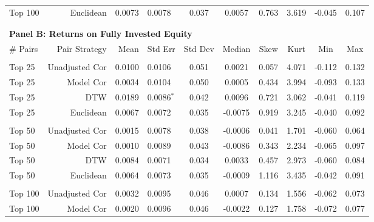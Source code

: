 \begin{table}[hp]
\begin{threeparttable}
\begin{tabular}{l r r l c c c c c c}
            Top 100   & Euclidean      &  0.0073 & 0.0078          & 0.037 &  0.0057 &  0.763 & 3.619 & -0.045 & 0.107 \\
            \vspace{-1mm} \\
            \hline
            \vspace{1 mm} \\
            \multicolumn{9}{l}{\textbf{Panel B: Returns on Fully Invested Equity}} \\
            \# Pairs  & Pair Strategy & Mean & Std Err & Std Dev & Median & Skew & Kurt & Min & Max \\
            \hline
            \vspace{-1mm} \\
            Top 25    & Unadjusted Cor &  0.0100 & 0.0106          & 0.051 &  0.0021 &  0.057 & 4.071 & -0.112 & 0.132 \\
            Top 25    & Model Cor      &  0.0034 & 0.0104          & 0.050 &  0.0005 &  0.434 & 3.994 & -0.093 & 0.133 \\
            Top 25    & DTW            &  0.0189 & 0.0086{$^{*}$}  & 0.042 &  0.0096 &  0.721 & 3.062 & -0.041 & 0.119 \\
            Top 25    & Euclidean      &  0.0067 & 0.0072          & 0.035 & -0.0075 &  0.919 & 3.245 & -0.040 & 0.092 \\
            \vspace{-1mm} \\
            Top 50    & Unadjusted Cor &  0.0015 & 0.0078          & 0.038 & -0.0006 &  0.041 & 1.701 & -0.060 & 0.064 \\
            Top 50    & Model Cor      &  0.0010 & 0.0089          & 0.043 & -0.0086 &  0.343 & 2.234 & -0.065 & 0.097 \\
            Top 50    & DTW            &  0.0084 & 0.0071          & 0.034 &  0.0033 &  0.457 & 2.973 & -0.060 & 0.084 \\
            Top 50    & Euclidean      &  0.0064 & 0.0073          & 0.035 & -0.0009 &  1.116 & 3.435 & -0.042 & 0.091 \\
            \vspace{-1mm} \\
            Top 100   & Unadjusted Cor &  0.0032 & 0.0095          & 0.046 &  0.0007 &  0.134 & 1.556 & -0.062 & 0.073 \\
            Top 100   & Model Cor      &  0.0020 & 0.0096          & 0.046 & -0.0022 &  0.127 & 1.758 & -0.072 & 0.077 \\

\end{tabular}
\end{threeparttable}
\end{table}
